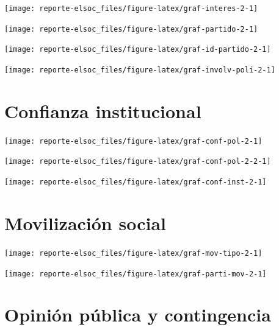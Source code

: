 \documentclass[
  12pt,
]{book}
\begin{document}
\begin{center}\texttt{[image: reporte-elsoc\_files/figure-latex/graf-interes-2-1]} \end{center}

\begin{center}\texttt{[image: reporte-elsoc\_files/figure-latex/graf-partido-2-1]} \end{center}

\begin{center}\texttt{[image: reporte-elsoc\_files/figure-latex/graf-id-partido-2-1]} \end{center}

\begin{center}\texttt{[image: reporte-elsoc\_files/figure-latex/graf-involv-poli-2-1]} \end{center}

\hypertarget{confianza-institucional}{%
\section{Confianza institucional}\label{confianza-institucional}}

\begin{center}\texttt{[image: reporte-elsoc\_files/figure-latex/graf-conf-pol-2-1]} \end{center}

\begin{center}\texttt{[image: reporte-elsoc\_files/figure-latex/graf-conf-pol-2-2-1]} \end{center}

\begin{center}\texttt{[image: reporte-elsoc\_files/figure-latex/graf-conf-inst-2-1]} \end{center}

\hypertarget{movilizaciuxf3n-social}{%
\section{Movilización social}\label{movilizaciuxf3n-social}}

\begin{center}\texttt{[image: reporte-elsoc\_files/figure-latex/graf-mov-tipo-2-1]} \end{center}

\begin{center}\texttt{[image: reporte-elsoc\_files/figure-latex/graf-parti-mov-2-1]} \end{center}

\hypertarget{opiniuxf3n-puxfablica-y-contingencia}{%
\section{Opinión pública y contingencia}\label{opiniuxf3n-puxfablica-y-contingencia}}
\end{document}
